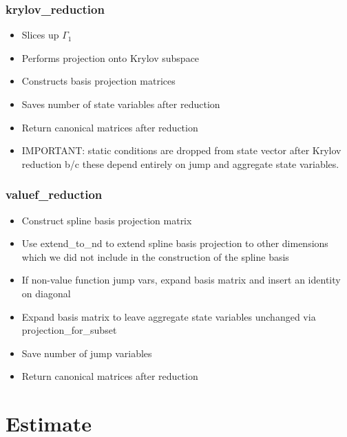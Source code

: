 \documentclass{beamer}
\begin{document}
\begin{frame}
\frametitle{krylov\_reduction}
\begin{itemize}
\item Slices up $\Gamma_1$
\item Performs projection onto Krylov subspace
\item Constructs basis projection matrices
\item Saves number of state variables after reduction
\item Return canonical matrices after reduction
\item IMPORTANT: static conditions are dropped from state vector after Krylov reduction b/c these depend entirely on jump and aggregate state variables.
\end{itemize}
\end{frame}
\begin{frame}
  \frametitle{valuef\_reduction}
\begin{itemize}
\item Construct spline basis projection matrix
\item Use extend\_to\_nd to extend spline basis projection to other dimensions which we did not include in the construction of the spline basis
\item If non-value function jump vars, expand basis matrix and insert an identity on diagonal
\item Expand basis matrix to leave aggregate state variables unchanged via projection\_for\_subset
\item Save number of jump variables
\item Return canonical matrices after reduction
\end{itemize}
\end{frame}

\section{Estimate}
\end{document}
